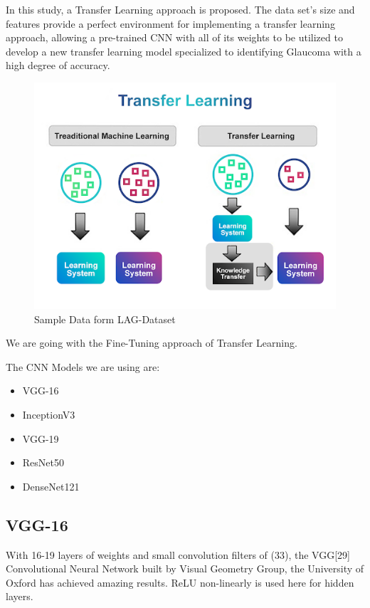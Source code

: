 \vspace{5mm}
In this study, a Transfer Learning approach is proposed. The data set's size and features provide a perfect environment for implementing a transfer learning approach, allowing a pre-trained CNN with all of its weights to be utilized to develop a new transfer learning model specialized to identifying Glaucoma with a high degree of accuracy.

\vspace{5mm}
\begin{figure}[hbt!]
\centering
\includegraphics[scale=0.75]{images/fig-7.png}
\caption{Sample Data form LAG-Dataset}
\label{fig:x Sample Data form LAG-Dataset}
\end{figure}

\vspace{5mm}
We are going with the Fine-Tuning approach of Transfer Learning.

\vspace{5mm}
The CNN Models we are using are:

\begin{itemize}
    \item VGG-16
    \item InceptionV3
    \item VGG-19
    \item ResNet50
    \item DenseNet121
\end{itemize}

\subsection{VGG-16}
With 16-19 layers of weights and small convolution filters of (33), the VGG[29] Convolutional Neural Network built by Visual Geometry Group, the University of Oxford has achieved amazing results. ReLU non-linearly is used here for hidden layers.

